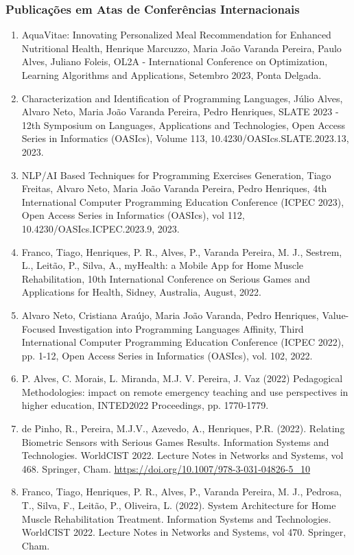 \documentclass[11pt]{article}
\begin{document}
\subsubsection{Publicações em Atas de Conferências Internacionais}
\begin{enumerate}
\item{AquaVitae: Innovating Personalized Meal Recommendation for Enhanced Nutritional Health, Henrique Marcuzzo, Maria João Varanda Pereira, Paulo Alves, Juliano Foleis, OL2A - International Conference on Optimization, Learning Algorithms and Applications, Setembro 2023, Ponta Delgada.}
\item{Characterization and Identification of Programming Languages, Júlio Alves, Alvaro Neto, Maria João Varanda Pereira, Pedro Henriques, SLATE 2023 - 12th Symposium on Languages, Applications and Technologies, Open Access Series in Informatics (OASIcs), Volume 113, 10.4230/OASIcs.SLATE.2023.13, 2023.}
\item{NLP/AI Based Techniques for Programming Exercises Generation, Tiago Freitas, Alvaro Neto, Maria João Varanda Pereira, Pedro Henriques, 4th International Computer Programming Education Conference (ICPEC 2023), Open Access Series in Informatics (OASIcs), vol 112, 10.4230/OASIcs.ICPEC.2023.9, 2023.}
\item{Franco, Tiago, Henriques, P. R., Alves, P., Varanda Pereira, M. J., Sestrem, L., Leitão, P., Silva, A., myHealth: a Mobile App for Home Muscle Rehabilitation, 10th International Conference on Serious Games and Applications for Health, Sidney, Australia, August, 2022. }
\item{Alvaro Neto, Cristiana Araújo, Maria João Varanda, Pedro Henriques, Value-Focused Investigation into Programming Languages Affinity, Third International Computer Programming Education Conference (ICPEC 2022), pp. 1-12, Open Access Series in Informatics (OASIcs), vol. 102, 2022. }
\item{P. Alves, C. Morais, L. Miranda, M.J. V. Pereira, J. Vaz (2022) Pedagogical Methodologies: impact on remote emergency teaching and use perspectives in higher education, INTED2022 Proceedings, pp. 1770-1779. }
\item{de Pinho, R., Pereira, M.J.V., Azevedo, A., Henriques, P.R. (2022). Relating Biometric Sensors with Serious Games Results. Information Systems and Technologies. WorldCIST 2022. Lecture Notes in Networks and Systems, vol 468. Springer, Cham. 
\url{https://doi.org/10.1007/978-3-031-04826-5_10}}
\item{Franco, Tiago, Henriques, P. R., Alves, P., Varanda Pereira, M. J., Pedrosa, T., Silva, F., Leitão, P., Oliveira, L. (2022). System Architecture for Home Muscle Rehabilitation Treatment. Information Systems and Technologies. WorldCIST 2022. Lecture Notes in Networks and Systems, vol 470. Springer, Cham. 
}
\end{enumerate}
\end{document}
